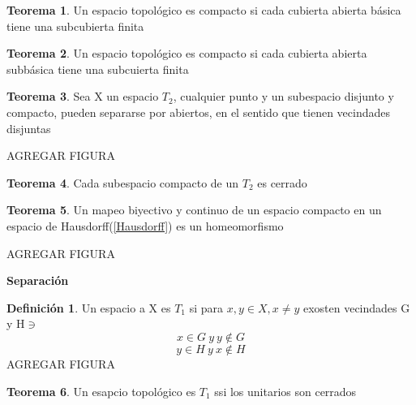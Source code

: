 \documentclass{article}
\theoremstyle{definition}
\newtheorem{definition}{Definición}[section]
\newtheorem{theorem}{Teorema}[section]
\begin{document}

\begin{theorem}
	Un espacio topológico es compacto si cada cubierta abierta básica tiene una subcubierta finita
\end{theorem}
\begin{theorem}
	Un espacio topológico es compacto si cada cubierta abierta subbásica tiene una subcuierta finita
\end{theorem}


\begin{theorem}
	Sea X un espacio $T_2$, cualquier punto y un subespacio disjunto y compacto, pueden separarse por abiertos, en el sentido que tienen vecindades disjuntas
	
	AGREGAR FIGURA
\end{theorem}


\begin{theorem}

	Cada subespacio compacto de un $T_2$ es cerrado
\end{theorem}
\begin{theorem}
	Un mapeo biyectivo y continuo de un espacio compacto en un espacio de Hausdorff(\ref{Hausdorff}) es un homeomorfismo
	
	AGREGAR FIGURA
\end{theorem}
\begin{LARGE}
	\textbf{Separación}
\end{LARGE}
\begin{definition}
	Un espacio a X es $T_1$ si para $x,y\in X, x\neq y$ exosten vecindades G y H$\ni$
	\[x\in G \ y \ y\not\in G\]
	\[y\in H \ y \ x\not\in H\]
	AGREGAR FIGURA
\end{definition}
\begin{theorem}
	Un esapcio topológico es $T_1$ ssi los unitarios son cerrados
\end{theorem}

\end{document}
